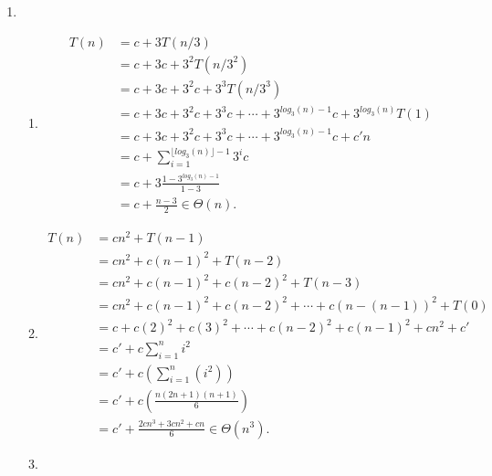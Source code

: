 \documentclass[10pt,oneside,reqno]{amsart}
\theoremstyle{plain}
\theoremstyle{definition}
\begin{document}
\begin{enumerate}[label=\arabic*.]
\begin{enumerate}
\end{enumerate}

\item 

\begin{enumerate}

\item \begin{equation}
\begin{aligned}
T(n) &= c + 3T(n/3)\\
&= c +3c + 3^2T(n/3^2)\\
&= c+ 3c + 3^2c + 3^3T(n/3^3)\\
&= c + 3c + 3^2c + 3^3c + \cdots + 3^{log_3(n) - 1}c +  3^{log_3(n)}T(1)\\
&= c + 3c + 3^2c + 3^3c + \cdots + 3^{log_3(n) - 1}c +  c'n\\
&= c  + \sum_{i = 1}^{\lfloor log_3(n)\rfloor - 1} 3^ic \\
&= c + 3\frac{1-3^{log_3(n) - 1}}{1 - 3}\\
&= c + \frac{n -3}{2} \in \Theta(n). 
\end{aligned}
\end{equation}

\item 

\begin{equation}
\begin{aligned}
T(n) &= cn^2 + T(n - 1) \\
&= cn^2 + c(n - 1)^2 + T(n - 2) \\
&= cn^2 + c(n - 1)^2 + c(n - 2)^2 + T(n - 3)\\
&= cn^2 + c(n - 1)^2 + c(n - 2)^2 + \cdots + c(n - (n - 1))^2 + T(0)\\
&= c + c(2)^2 + c(3)^2 + \cdots + c(n - 2)^2+ c(n - 1)^2 + cn^2 + c'\\
&= c' + c\sum_{i = 1}^n i^2\\
&= c' + c \left(\sum_{i = 1}^n (i^2)\right)\\
&= c' + c \left(\frac{n(2n + 1)(n + 1)}{6} \right)\\
&= c' +  \frac{2cn^3 + 3cn^2 + cn}{6} \in \Theta(n^3). 
\end{aligned}
\end{equation}

\item 


\end{enumerate}
\end{enumerate}
\end{document}
